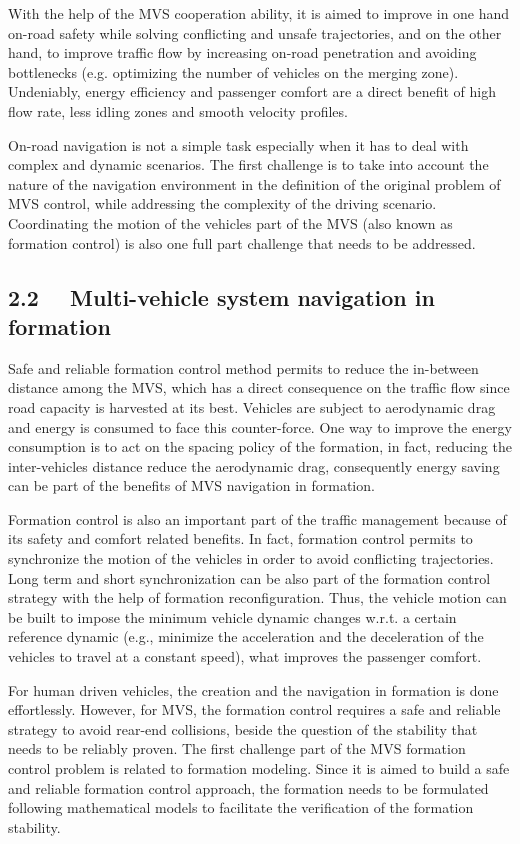With the help of the MVS cooperation ability, it is aimed to improve in one hand on-road safety while solving conflicting and unsafe trajectories, and on the other hand, to improve traffic flow by increasing on-road penetration and avoiding bottlenecks (e.g. optimizing the number of vehicles on the merging zone). Undeniably, energy efficiency and passenger comfort are a direct benefit of high flow rate, less idling zones and smooth velocity profiles. 

On-road navigation is not a simple task especially when it has to deal with complex and dynamic scenarios. The first challenge is to take into account the nature of the navigation environment in the definition of the original problem of MVS control, while addressing the complexity of the driving scenario. Coordinating the motion of the vehicles part of the MVS (also known as formation control) is also one full part challenge that needs to be addressed. 


\subsection*{2.2 \, \, Multi-vehicle system navigation in formation}

Safe and reliable formation control method permits to reduce the in-between distance among the MVS, which has a direct consequence on the traffic flow since road capacity is harvested at its best. Vehicles are subject to aerodynamic drag and energy is consumed to face this counter-force. One way to improve the energy consumption is to act on the spacing policy of the formation, in fact, reducing the inter-vehicles distance reduce the aerodynamic drag, consequently energy saving can be part of the benefits of MVS navigation in formation. 

Formation control is also an important part of the traffic management because of its safety and comfort related benefits. In fact, formation control permits to synchronize the motion of the vehicles in order to avoid conflicting trajectories. Long term and short synchronization can be also part of the formation control strategy with the help of formation reconfiguration. Thus, the vehicle motion can be built to impose the minimum vehicle dynamic changes w.r.t. a certain reference dynamic (e.g., minimize the acceleration and the deceleration of the vehicles to travel at a constant speed), what improves the passenger comfort. 


For human driven vehicles, the creation and the navigation in formation is done effortlessly. However, for MVS, the formation control requires a safe and reliable strategy to avoid rear-end collisions, beside the question of the stability that needs to be reliably proven. The first challenge part of the MVS formation control problem is related to formation modeling. Since it is aimed to build a safe and reliable formation control approach, the formation needs to be formulated following mathematical models to facilitate the verification of the formation stability. 

